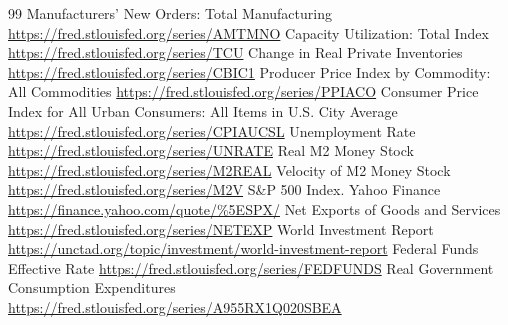 \begin{RaggedRight}
\begin{thebibliography}{99}
     \hypertarget{bib:FRED-AMTMNO}{} Manufacturers' New Orders: Total Manufacturing \url{https://fred.stlouisfed.org/series/AMTMNO}
     \hypertarget{bib:FRED-TCU}{} Capacity Utilization: Total Index \url{https://fred.stlouisfed.org/series/TCU}
     \hypertarget{bib:FRED-CBIC1}{} Change in Real Private Inventories \url{https://fred.stlouisfed.org/series/CBIC1}
     \hypertarget{bib:FRED-PPIACO}{} Producer Price Index by Commodity: All Commodities \url{https://fred.stlouisfed.org/series/PPIACO}
     \hypertarget{bib:FRED-CPIAUCSL}{} Consumer Price Index for All Urban Consumers: All Items in U.S. City Average \url{https://fred.stlouisfed.org/series/CPIAUCSL}
     \hypertarget{bib:FRED-UNRATE}{} Unemployment Rate \url{https://fred.stlouisfed.org/series/UNRATE}
     \hypertarget{bib:FRED-M2REAL}{} Real M2 Money Stock \url{https://fred.stlouisfed.org/series/M2REAL}
     \hypertarget{bib:FRED-M2V}{} Velocity of M2 Money Stock \url{https://fred.stlouisfed.org/series/M2V}
     \hypertarget{bib:SP500}{} S\&P 500 Index. Yahoo Finance \url{https://finance.yahoo.com/quote/%5ESPX/}
     \hypertarget{bib:FRED-NETEXP}{} Net Exports of Goods and Services \url{https://fred.stlouisfed.org/series/NETEXP}
     \hypertarget{bib:UNCTAD}{} World Investment Report \url{https://unctad.org/topic/investment/world-investment-report}
     \hypertarget{bib:FRED-FEDFUNDS}{} Federal Funds Effective Rate \url{https://fred.stlouisfed.org/series/FEDFUNDS}
     \hypertarget{bib:FRED-A955RX1Q020SBEA}{} Real Government Consumption Expenditures \url{https://fred.stlouisfed.org/series/A955RX1Q020SBEA}
\end{thebibliography}
\end{RaggedRight}